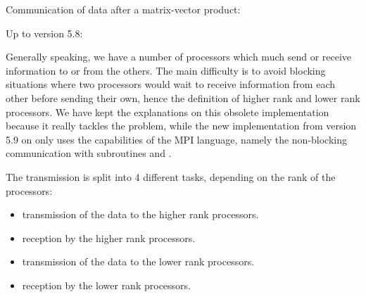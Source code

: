 Communication of data after a matrix-vector product:

Up to version 5.8:

Generally speaking, we have a number of processors which much send or receive
information to or from the others. The main difficulty is to avoid blocking
situations where two processors would wait to receive information from each
other before sending their own, hence the definition of higher rank and lower
rank processors. We have kept the explanations on this obsolete implementation
because it really tackles the problem, while the new implementation from
version 5.9 on only uses the capabilities of the MPI language, namely the non-blocking communication with subroutines  and
.

The transmission is split into 4 different tasks, depending on the rank of the processors:
\begin{itemize}
  \item transmission of the data to the higher rank processors.
  \item reception by the higher rank processors.
  \item transmission of the data to the lower rank processors.
  \item reception by the lower rank processors.
\end{itemize}

